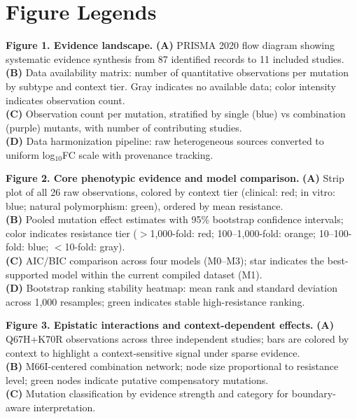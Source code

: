 \documentclass[preprint]{elsarticle}
\begin{document}
\newpage
\section*{Figure Legends}

\textbf{Figure 1. Evidence landscape.}
\textbf{(A)} PRISMA 2020 flow diagram showing systematic evidence synthesis from 87 identified records to 11 included studies.\\
\textbf{(B)} Data availability matrix: number of quantitative observations per mutation by subtype and context tier. Gray indicates no available data; color intensity indicates observation count.\\
\textbf{(C)} Observation count per mutation, stratified by single (blue) vs combination (purple) mutants, with number of contributing studies.\\
\textbf{(D)} Data harmonization pipeline: raw heterogeneous sources converted to uniform log$_{10}$FC scale with provenance tracking.

\textbf{Figure 2. Core phenotypic evidence and model comparison.}
\textbf{(A)} Strip plot of all 26 raw observations, colored by context tier (clinical: red; in vitro: blue; natural polymorphism: green), ordered by mean resistance.\\
\textbf{(B)} Pooled mutation effect estimates with 95\% bootstrap confidence intervals; color indicates resistance tier ($>$1,000-fold: red; 100--1,000-fold: orange; 10--100-fold: blue; $<$10-fold: gray).\\
\textbf{(C)} AIC/BIC comparison across four models (M0--M3); star indicates the best-supported model within the current compiled dataset (M1).\\
\textbf{(D)} Bootstrap ranking stability heatmap: mean rank and standard deviation across 1,000 resamples; green indicates stable high-resistance ranking.

\textbf{Figure 3. Epistatic interactions and context-dependent effects.}
\textbf{(A)} Q67H+K70R observations across three independent studies; bars are colored by context to highlight a context-sensitive signal under sparse evidence.\\
\textbf{(B)} M66I-centered combination network; node size proportional to resistance level; green nodes indicate putative compensatory mutations.\\
\textbf{(C)} Mutation classification by evidence strength and category for boundary-aware interpretation.
\end{document}
